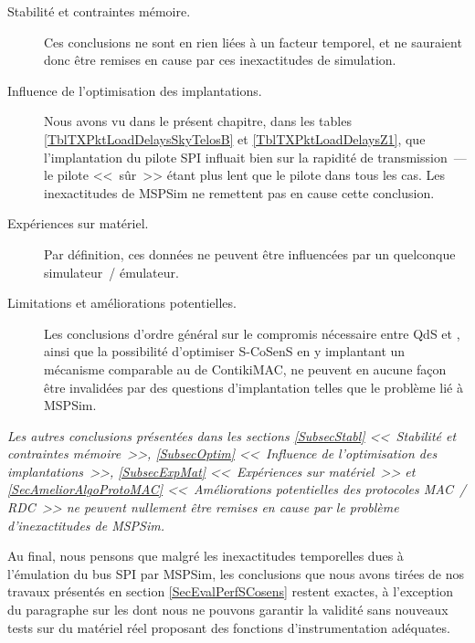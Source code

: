 \begin{description}

\item[Stabilité et contraintes mémoire.] Ces conclusions ne sont en rien
liées à un facteur temporel, et ne sauraient donc être remises en cause
par ces inexactitudes de simulation.

\item[Influence de l'optimisation des implantations.] Nous avons vu
dans le présent chapitre, dans les tables \vref{TblTXPktLoadDelaysSkyTelosB}
et \vref{TblTXPktLoadDelaysZ1}, que l'implantation du pilote SPI influait
bien sur la rapidité de transmission~--- le pilote <<~sûr~>> étant plus lent
que le pilote  dans tous les cas. Les inexactitudes
de MSPSim ne remettent pas en cause cette conclusion.

\item[Expériences sur matériel.] Par définition, ces données ne peuvent
être influencées par un quelconque simulateur~/ émulateur.

\item[Limitations et améliorations potentielles.] Les conclusions d'ordre
général sur le compromis nécessaire entre QdS et ,
ainsi que la possibilité d'optimiser S-CoSenS en y implantant un
mécanisme comparable au  de ContikiMAC,
ne peuvent en aucune façon être invalidées par des questions
d'implantation telles que le problème lié à MSPSim.

\end{description}

\noindent\emph{Les autres conclusions présentées dans les sections
\vref{SubsecStabl} <<~Stabilité et contraintes mémoire~>>,
\vref{SubsecOptim} <<~Influence de l'optimisation des implantations~>>,
\vref{SubsecExpMat} <<~Expériences sur matériel~>>
et \vref{SecAmeliorAlgoProtoMAC} <<~Améliorations potentielles des
protocoles MAC~/ RDC~>> ne peuvent nullement être remises en cause par
le problème d'inexactitudes de MSPSim.}

\bigskip

Au final, nous pensons que malgré les inexactitudes temporelles dues
à l'émulation du bus SPI par MSPSim, les conclusions que nous avons
tirées de nos travaux présentés en section \vref{SecEvalPerfSCosens}
restent exactes, à l'exception du paragraphe sur les 
dont nous ne pouvons garantir la validité sans nouveaux tests sur du
matériel réel proposant des fonctions d'instrumentation adéquates.


